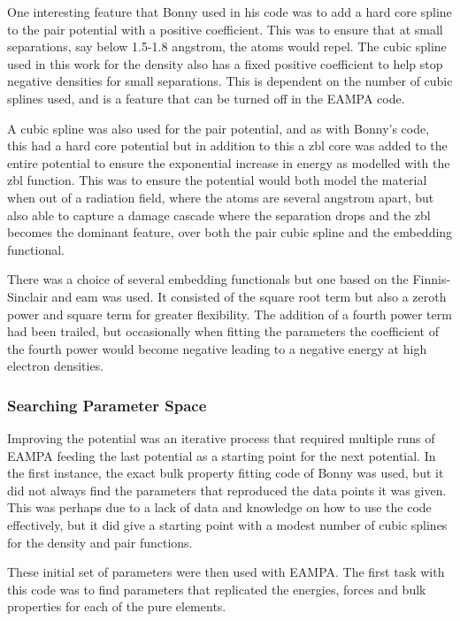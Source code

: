 One interesting feature that Bonny used in his code was to add a hard core spline to the pair potential with a positive coefficient.  This was to ensure that at small separations, say below 1.5-1.8 angstrom, the atoms would repel.  The cubic spline used in this work for the density also has a fixed positive coefficient to help stop negative densities for small separations.  This is dependent on the number of cubic splines used, and is a feature that can be turned off in the EAMPA code.

A cubic spline was also used for the pair potential, and as with Bonny's code, this had a hard core potential but in addition to this a \acrshort{zbl} core was added to the entire potential to ensure the exponential increase in energy as modelled with the \acrshort{zbl} function.  This was to ensure the potential would both model the material when out of a radiation field, where the atoms are several angstrom apart, but also able to capture a damage cascade where the separation drops and the \acrshort{zbl} becomes the dominant feature, over both the pair cubic spline and the embedding functional.

There was a choice of several embedding functionals but one based on the Finnis-Sinclair and \acrshort{eam} was used.  It consisted of the square root term but also a zeroth power and square term for greater flexibility.  The addition of a fourth power term had been trailed, but occasionally when fitting the parameters the coefficient of the fourth power would become negative leading to a negative energy at high electron densities.


\subsubsection{Searching Parameter Space}

Improving the potential was an iterative process that required multiple runs of EAMPA feeding the last potential as a starting point for the next potential.  In the first instance, the exact bulk property fitting code of Bonny was used, but it did not always find the parameters that reproduced the data points it was given.  This was perhaps due to a lack of data and knowledge on how to use the code effectively, but it did give a starting point with a modest number of cubic splines for the density and pair functions.

These initial set of parameters were then used with EAMPA.  The first task with this code was to find parameters that replicated the energies, forces and bulk properties for each of the pure elements.

